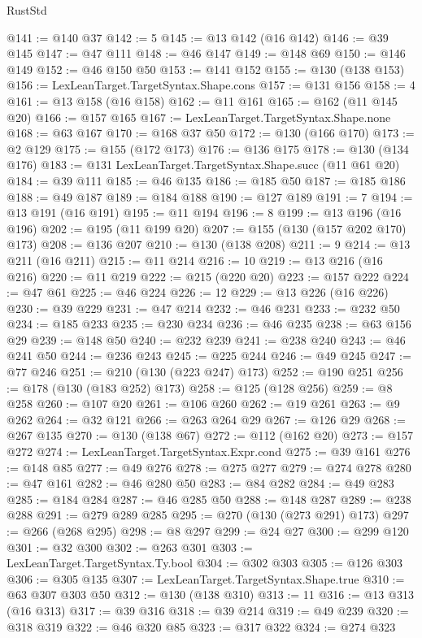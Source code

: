 \begin{lexlean}{RustStd}
\begin{coremodule}
@141 := @140 @37
@142 := 5
@145 := @13 @142 (@16 @142)
@146 := @39 @145
@147 := @47 @111
@148 := @46 @147
@149 := @148 @69
@150 := @146 @149
@152 := @46 @150 @50
@153 := @141 @152
@155 := @130 (@138 @153)
@156 := LexLeanTarget.TargetSyntax.Shape.cons
@157 := @131 @156
@158 := 4
@161 := @13 @158 (@16 @158)
@162 := @11 @161
@165 := @162 (@11 @145 @20)
@166 := @157 @165
@167 := LexLeanTarget.TargetSyntax.Shape.none
@168 := @63 @167
@170 := @168 @37 @50
@172 := @130 (@166 @170)
@173 := @2 @129
@175 := @155 (@172 @173)
@176 := @136 @175
@178 := @130 (@134 @176)
@183 := @131 LexLeanTarget.TargetSyntax.Shape.succ (@11 @61 @20)
@184 := @39 @111
@185 := @46 @135
@186 := @185 @50
@187 := @185 @186
@188 := @49 @187
@189 := @184 @188
@190 := @127 @189
@191 := 7
@194 := @13 @191 (@16 @191)
@195 := @11 @194
@196 := 8
@199 := @13 @196 (@16 @196)
@202 := @195 (@11 @199 @20)
@207 := @155 (@130 (@157 @202 @170) @173)
@208 := @136 @207
@210 := @130 (@138 @208)
@211 := 9
@214 := @13 @211 (@16 @211)
@215 := @11 @214
@216 := 10
@219 := @13 @216 (@16 @216)
@220 := @11 @219
@222 := @215 (@220 @20)
@223 := @157 @222
@224 := @47 @61
@225 := @46 @224
@226 := 12
@229 := @13 @226 (@16 @226)
@230 := @39 @229
@231 := @47 @214
@232 := @46 @231
@233 := @232 @50
@234 := @185 @233
@235 := @230 @234
@236 := @46 @235
@238 := @63 @156 @29
@239 := @148 @50
@240 := @232 @239
@241 := @238 @240
@243 := @46 @241 @50
@244 := @236 @243
@245 := @225 @244
@246 := @49 @245
@247 := @77 @246
@251 := @210 (@130 (@223 @247) @173)
@252 := @190 @251
@256 := @178 (@130 (@183 @252) @173)
@258 := @125 (@128 @256)
@259 := @8 @258
@260 := @107 @20
@261 := @106 @260
@262 := @19 @261
@263 := @9 @262
@264 := @32 @121
@266 := @263 @264 @29
@267 := @126 @29
@268 := @267 @135
@270 := @130 (@138 @67)
@272 := @112 (@162 @20)
@273 := @157 @272
@274 := LexLeanTarget.TargetSyntax.Expr.cond
@275 := @39 @161
@276 := @148 @85
@277 := @49 @276
@278 := @275 @277
@279 := @274 @278
@280 := @47 @161
@282 := @46 @280 @50
@283 := @84 @282
@284 := @49 @283
@285 := @184 @284
@287 := @46 @285 @50
@288 := @148 @287
@289 := @238 @288
@291 := @279 @289 @285
@295 := @270 (@130 (@273 @291) @173)
@297 := @266 (@268 @295)
@298 := @8 @297
@299 := @24 @27
@300 := @299 @120
@301 := @32 @300
@302 := @263 @301
@303 := LexLeanTarget.TargetSyntax.Ty.bool
@304 := @302 @303
@305 := @126 @303
@306 := @305 @135
@307 := LexLeanTarget.TargetSyntax.Shape.true
@310 := @63 @307 @303 @50
@312 := @130 (@138 @310)
@313 := 11
@316 := @13 @313 (@16 @313)
@317 := @39 @316
@318 := @39 @214
@319 := @49 @239
@320 := @318 @319
@322 := @46 @320 @85
@323 := @317 @322
@324 := @274 @323

\end{coremodule}
\end{lexlean}
